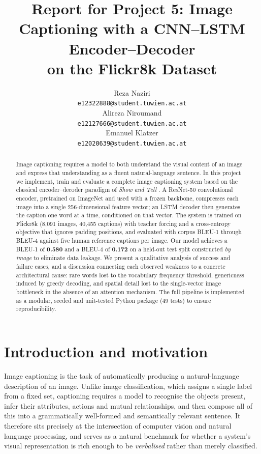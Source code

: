 \documentclass{article}
\title{Report for Project 5: Image Captioning with a CNN--LSTM Encoder--Decoder\\
       on the Flickr8k Dataset}
\author{
  Reza Naziri\\
  \texttt{e12322888@student.tuwien.ac.at} \\
  \And
  Alireza Niroumand \\
  \texttt{e12127666@student.tuwien.ac.at} \\
  \And
  Emanuel Klatzer \\
  \texttt{e12020639@student.tuwien.ac.at} \\
}
\begin{document}
\maketitle


\begin{abstract}
Image captioning requires a model to both understand the visual content of an
image and express that understanding as a fluent natural-language sentence. In
this project we implement, train and evaluate a complete image captioning system
based on the classical encoder--decoder paradigm of \emph{Show and Tell}
\citep{vinyals2015show}. A ResNet-50 convolutional encoder, pretrained on
ImageNet and used with a frozen backbone, compresses each image into a single
256-dimensional feature vector; an LSTM decoder then generates the caption one
word at a time, conditioned on that vector. The system is trained on Flickr8k
(8{,}091 images, 40{,}455 captions) with teacher forcing and a cross-entropy
objective that ignores padding positions, and evaluated with corpus BLEU-1
through BLEU-4 against five human reference captions per image. Our model
achieves a BLEU-1 of \textbf{0.580} and a BLEU-4 of \textbf{0.172} on a
held-out test split constructed \emph{by image} to eliminate data leakage. We
present a qualitative analysis of success and failure cases, and a discussion
connecting each observed weakness to a concrete architectural cause: rare words
lost to the vocabulary frequency threshold, genericness induced by greedy
decoding, and spatial detail lost to the single-vector image bottleneck in the
absence of an attention mechanism. The full pipeline is implemented as a
modular, seeded and unit-tested Python package (49 tests) to ensure
reproducibility.
\end{abstract}


\section{Introduction and motivation}

Image captioning is the task of automatically producing a natural-language description of an image.
Unlike image classification, which assigns a single label from a fixed set, captioning requires a model to recognise the objects present, infer their attributes, actions and mutual relationships, 
and then compose all of this into a grammatically well-formed and semantically relevant sentence.
It therefore sits precisely at the intersection of computer vision and natural language processing,
and serves as a natural benchmark for whether a system's visual representation is rich enough to be 
\emph{verbalised} rather than merely classified.
\end{document}

